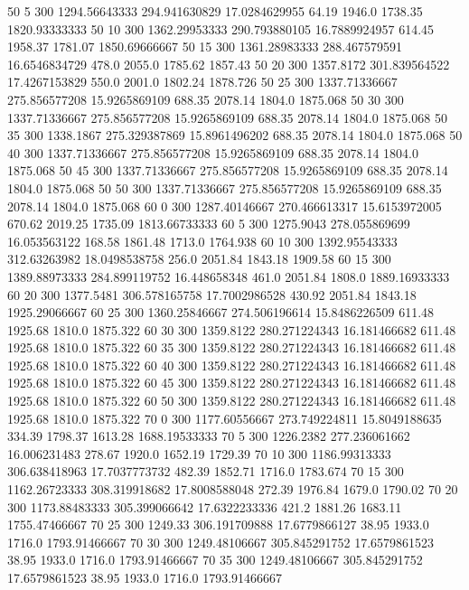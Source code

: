 50  5  300  1294.56643333  294.941630829  17.0284629955  64.19  1946.0  1738.35  1820.93333333 
50  10  300  1362.29953333  290.793880105  16.7889924957  614.45  1958.37  1781.07  1850.69666667 
50  15  300  1361.28983333  288.467579591  16.6546834729  478.0  2055.0  1785.62  1857.43 
50  20  300  1357.8172  301.839564522  17.4267153829  550.0  2001.0  1802.24  1878.726 
50  25  300  1337.71336667  275.856577208  15.9265869109  688.35  2078.14  1804.0  1875.068 
50  30  300  1337.71336667  275.856577208  15.9265869109  688.35  2078.14  1804.0  1875.068 
50  35  300  1338.1867  275.329387869  15.8961496202  688.35  2078.14  1804.0  1875.068 
50  40  300  1337.71336667  275.856577208  15.9265869109  688.35  2078.14  1804.0  1875.068 
50  45  300  1337.71336667  275.856577208  15.9265869109  688.35  2078.14  1804.0  1875.068 
50  50  300  1337.71336667  275.856577208  15.9265869109  688.35  2078.14  1804.0  1875.068 
60  0  300  1287.40146667  270.466613317  15.6153972005  670.62  2019.25  1735.09  1813.66733333 
60  5  300  1275.9043  278.055869699  16.053563122  168.58  1861.48  1713.0  1764.938 
60  10  300  1392.95543333  312.63263982  18.0498538758  256.0  2051.84  1843.18  1909.58 
60  15  300  1389.88973333  284.899119752  16.448658348  461.0  2051.84  1808.0  1889.16933333 
60  20  300  1377.5481  306.578165758  17.7002986528  430.92  2051.84  1843.18  1925.29066667 
60  25  300  1360.25846667  274.506196614  15.8486226509  611.48  1925.68  1810.0  1875.322 
60  30  300  1359.8122  280.271224343  16.181466682  611.48  1925.68  1810.0  1875.322 
60  35  300  1359.8122  280.271224343  16.181466682  611.48  1925.68  1810.0  1875.322 
60  40  300  1359.8122  280.271224343  16.181466682  611.48  1925.68  1810.0  1875.322 
60  45  300  1359.8122  280.271224343  16.181466682  611.48  1925.68  1810.0  1875.322 
60  50  300  1359.8122  280.271224343  16.181466682  611.48  1925.68  1810.0  1875.322 
70  0  300  1177.60556667  273.749224811  15.8049188635  334.39  1798.37  1613.28  1688.19533333 
70  5  300  1226.2382  277.236061662  16.006231483  278.67  1920.0  1652.19  1729.39 
70  10  300  1186.99313333  306.638418963  17.7037773732  482.39  1852.71  1716.0  1783.674 
70  15  300  1162.26723333  308.319918682  17.8008588048  272.39  1976.84  1679.0  1790.02 
70  20  300  1173.88483333  305.399066642  17.6322233336  421.2  1881.26  1683.11  1755.47466667 
70  25  300  1249.33  306.191709888  17.6779866127  38.95  1933.0  1716.0  1793.91466667 
70  30  300  1249.48106667  305.845291752  17.6579861523  38.95  1933.0  1716.0  1793.91466667 
70  35  300  1249.48106667  305.845291752  17.6579861523  38.95  1933.0  1716.0  1793.91466667 
